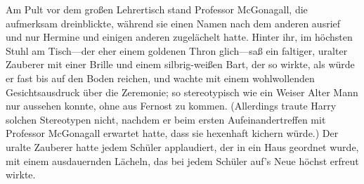 Am Pult vor dem großen Lehrertisch stand Professor McGonagall, die aufmerksam dreinblickte, während sie einen Namen nach dem anderen ausrief und nur Hermine und einigen anderen zugelächelt hatte. Hinter ihr, im höchsten Stuhl am Tisch—der eher einem goldenen Thron glich—saß ein faltiger, uralter Zauberer mit einer Brille und einem silbrig-weißen Bart, der so wirkte, als würde er fast bis auf den Boden reichen, und wachte mit einem wohlwollenden Gesichtsausdruck über die Zeremonie; so stereotypisch wie ein Weiser Alter Mann nur aussehen konnte, ohne aus Fernost zu kommen. (Allerdings traute Harry solchen Stereotypen nicht, nachdem er beim ersten Aufeinandertreffen mit Professor McGonagall erwartet hatte, dass sie hexenhaft kichern würde.) Der uralte Zauberer hatte jedem Schüler applaudiert, der in ein Haus geordnet wurde, mit einem ausdauernden Lächeln, das bei jedem Schüler auf’s Neue höchst erfreut wirkte.

